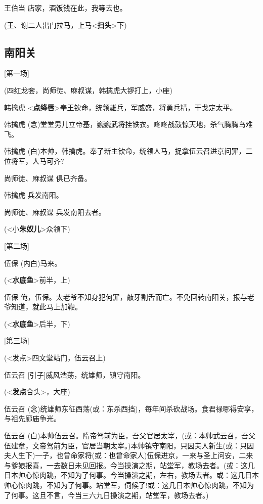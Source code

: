 王伯当 店家，酒饭钱在此，我等去也。

(王、谢二人出门拉马，上马\textless{}\textbf{扫头}\textgreater{}下)

\newpage
\hypertarget{ux5357ux9633ux5173}{%
\subsection{南阳关}\label{ux5357ux9633ux5173}}

{[}第一场{]}

(四红龙套，尚师徒、麻叔谋，韩擒虎大锣打上，小座)

韩擒虎
\textless{}\textbf{点绛唇}\textgreater{}奉王钦命，统领雄兵，军威盛，将勇兵精，干戈定太平。

韩擒虎
(念)堂堂男儿立帝基，巍巍武将挂铁衣。咚咚战鼓惊天地，杀气腾腾鸟难飞。

韩擒虎
(白)本帅，韩擒虎。奉了新主钦命，统领人马，捉拿伍云召进京问罪，二位将军，人马可齐?

尚师徒、麻叔谋 俱已齐备。

韩擒虎 兵发南阳。

尚师徒、麻叔谋 兵发南阳去者。

(\textless{}小\textbf{朱奴儿}\textgreater{}众领下)

{[}第二场{]}

伍保 (内白)马来。

(\textless{}\textbf{水底鱼}\textgreater{}前半，上)

伍保
俺，伍保。太老爷不知身犯何罪，敲牙割舌而亡。不免回转南阳关，报与老爷知道，就此马上加鞭。

(\textless{}\textbf{水底鱼}\textgreater{}后半，下)

{[}第三场{]}

(\textless{}发点\textgreater{}四文堂站门，伍云召上)

伍云召 {[}引子{]}威风浩荡，统雄师，镇守南阳。

(\textless{}\textbf{发点}合头\textgreater{}，大座)

伍云召
(念)统雄师东征西荡(或：东杀西挡)，每年间杀砍战场。食君禄哪得安享，与祖先廊庙争光。

伍云召
(白)本帅伍云召。隋帝驾前为臣，吾父官居太宰，(或：本帅武云召，吾父伍建章，文帝驾前为臣，官居当朝太宰。)本帅镇守南阳，只因夫人新生(或：只因夫人生下)一子，也曾命家将(或：也曾命家人)伍保进京，一来与圣上问安，二来与爹娘报喜，一去数日未见回报。今当操演之期，站堂军，教场去者。(或：这几日本帅心惊肉跳，不知为了何事。今当操演之期，左右，教场去者。或：这几日本帅心惊肉跳，不知为了何事。站堂军，伺候了!或：这几日本帅心惊肉跳，不知为了何事。这且不言，今当三六九日操演之期，站堂军，教场去者。)

